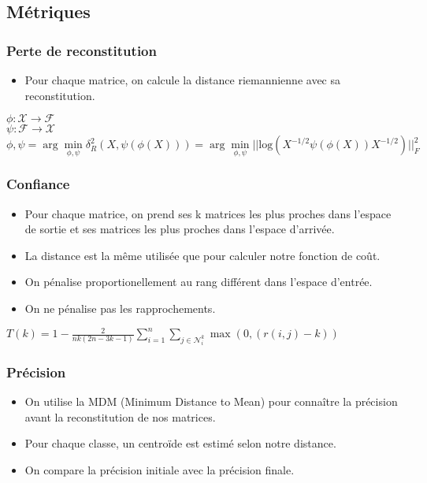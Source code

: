 \documentclass{beamer}
\begin{document}
\subsection{Métriques}
\begin{frame}
    \frametitle{Perte de reconstitution}
    \begin{itemize}
        \item Pour chaque matrice, on calcule la distance riemannienne avec sa reconstitution.
    \end{itemize}
    \begin{center}
        $ \phi : \mathcal{X} \rightarrow \mathcal{F}$ \\
        $ \psi : \mathcal{F} \rightarrow \mathcal{X}$ \\
        $ \phi,\psi = \arg\min\limits_{\phi,\psi} \delta^2_R(X,\psi (\phi(X))) =  \arg \min\limits_{\phi,\psi} ||\text{log}(X^{-1/2}\psi (\phi(X))X^{-1/2})||^2_F$
    \end{center}
    \end{frame}
\begin{frame}
\frametitle{Confiance}
\begin{itemize}
    \item Pour chaque matrice, on prend ses k matrices les plus proches dans l'espace de sortie et ses matrices les plus proches dans l'espace d'arrivée.
    \item La distance est la même utilisée que pour calculer notre fonction de coût.
    \item On pénalise proportionellement au rang différent dans l'espace d'entrée.
    \item On ne pénalise pas les rapprochements.
\end{itemize}
\begin{center}
    $ T(k) = 1 - \frac{2}{nk(2n-3k-1)} \sum\limits_{i=1}^n\sum\limits_{j\in\mathcal{N}_i^k} \max(0,(r(i,j)-k)) $
\end{center}
\end{frame}
\begin{frame}
\frametitle{Précision}
\begin{itemize}
    \item On utilise la MDM (Minimum Distance to Mean) pour connaître la précision avant la reconstitution de nos matrices.
    \item Pour chaque classe, un centroïde est estimé selon notre distance.
    \item On compare la précision initiale avec la précision finale.
\end{itemize}
\end{frame}
\end{document}
